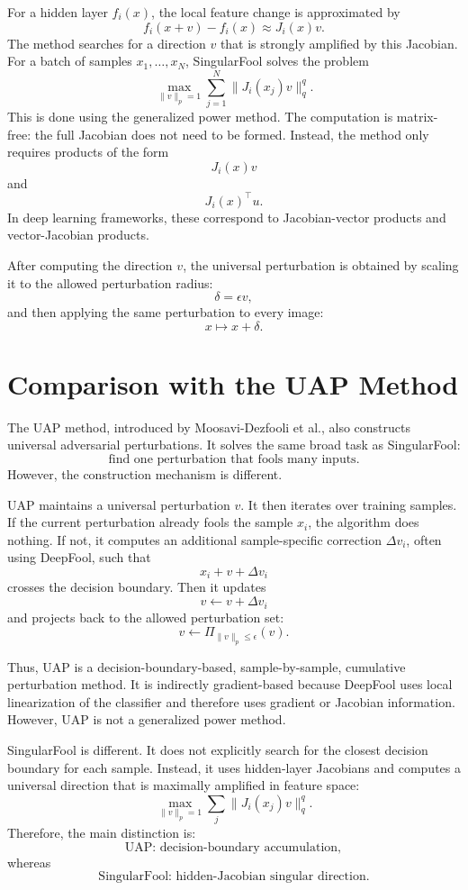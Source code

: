 \documentclass{article}
\begin{document}
For a hidden layer \(f_i(x)\), the local feature change is approximated by
\[
f_i(x+v)-f_i(x)\approx J_i(x)v.
\]
The method searches for a direction \(v\) that is strongly amplified by this Jacobian. For a batch of samples \(x_1,\dots,x_N\), SingularFool solves the problem
\[
\max_{\|v\|_p=1}
\sum_{j=1}^N
\|J_i(x_j)v\|_q^q.
\]
This is done using the generalized power method. The computation is matrix-free: the full Jacobian does not need to be formed. Instead, the method only requires products of the form
\[
J_i(x)v
\]
and
\[
J_i(x)^\top u.
\]
In deep learning frameworks, these correspond to Jacobian-vector products and vector-Jacobian products.

After computing the direction \(v\), the universal perturbation is obtained by scaling it to the allowed perturbation radius:
\[
\delta=\epsilon v,
\]
and then applying the same perturbation to every image:
\[
x\mapsto x+\delta.
\]

\section{Comparison with the UAP Method}

The UAP method, introduced by Moosavi-Dezfooli et al., also constructs universal adversarial perturbations. It solves the same broad task as SingularFool:
\[
\text{find one perturbation that fools many inputs}.
\]
However, the construction mechanism is different.

UAP maintains a universal perturbation \(v\). It then iterates over training samples. If the current perturbation already fools the sample \(x_i\), the algorithm does nothing. If not, it computes an additional sample-specific correction \(\Delta v_i\), often using DeepFool, such that
\[
x_i+v+\Delta v_i
\]
crosses the decision boundary. Then it updates
\[
v\leftarrow v+\Delta v_i
\]
and projects back to the allowed perturbation set:
\[
v\leftarrow \Pi_{\|v\|_p\leq \epsilon}(v).
\]

Thus, UAP is a decision-boundary-based, sample-by-sample, cumulative perturbation method. It is indirectly gradient-based because DeepFool uses local linearization of the classifier and therefore uses gradient or Jacobian information. However, UAP is not a generalized power method.

SingularFool is different. It does not explicitly search for the closest decision boundary for each sample. Instead, it uses hidden-layer Jacobians and computes a universal direction that is maximally amplified in feature space:
\[
\max_{\|v\|_p=1}
\sum_j
\|J_i(x_j)v\|_q^q.
\]
Therefore, the main distinction is:
\[
\text{UAP: decision-boundary accumulation},
\]
whereas
\[
\text{SingularFool: hidden-Jacobian singular direction}.
\]
\end{document}
